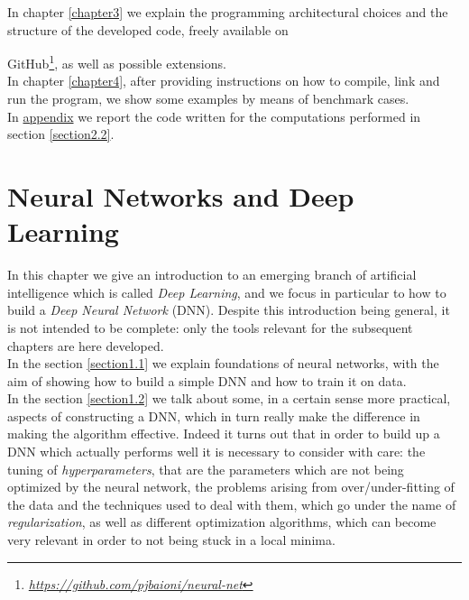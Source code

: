 \documentclass[12pt, a4paper]{report}
\theoremstyle{definition}
\begin{document}
In chapter \ref{chapter3} we explain the programming architectural choices and the structure of the developed code, freely available on {GitHub\footnote{\href{https://github.com/pjbaioni/neural-net}{\emph{https://github.com/pjbaioni/neural-net}}}, as well as possible extensions.\\
In chapter \ref{chapter4}, after providing instructions on how to compile, link and run the program, we show some examples by means of benchmark cases.\\
In \hyperref[appendix]{appendix} we report the \cite{freefem++} code written for the computations performed in section \ref{section2.2}.




\chapter{Neural Networks and Deep Learning}\label{chapter1}
In this chapter we give an introduction to an emerging branch of artificial intelligence which is called \textit{Deep Learning}, and we focus in particular to how to build a \textit{Deep Neural Network} (DNN). Despite this introduction being general, it is not intended to be complete: only the tools relevant for the subsequent chapters are here developed.\\
In the section \ref{section1.1} we explain foundations of neural networks, with the aim of showing how to build a simple DNN and how to train it on data.\\
In the section \ref{section1.2} we talk about some, in a certain sense more practical, aspects of constructing a DNN, which in turn really make the difference in making the algorithm effective. Indeed it turns out that in order to build up a DNN which actually performs well it is necessary to consider with care: the tuning of \textit{hyperparameters}, that are the parameters which are not being optimized by the neural network, the problems arising from over/under-fitting of the data and the techniques used to deal with them, which go under the name of \textit{regularization}, as well as different optimization algorithms, which can become very relevant in order to not being stuck in a local minima.\\

}
\end{document}
